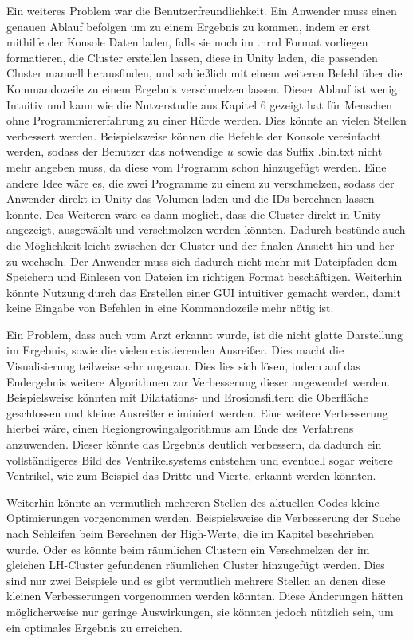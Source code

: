 Ein weiteres Problem war die Benutzerfreundlichkeit. Ein Anwender muss einen genauen Ablauf befolgen um zu einem Ergebnis zu kommen, indem er erst mithilfe der Konsole Daten laden, falls sie noch im .nrrd Format vorliegen formatieren, die Cluster erstellen lassen, diese in Unity laden, die passenden Cluster manuell herausfinden, und schließlich mit einem weiteren Befehl über die Kommandozeile zu einem Ergebnis verschmelzen lassen. Dieser Ablauf ist wenig Intuitiv und kann wie die Nutzerstudie aus Kapitel 6 gezeigt hat für Menschen ohne Programmiererfahrung zu einer Hürde werden.
\newline
Dies könnte an vielen Stellen verbessert werden. Beispielsweise können die Befehle der Konsole vereinfacht werden, sodass der Benutzer das notwendige $u$ sowie das Suffix .bin.txt nicht mehr angeben muss, da diese vom Programm schon hinzugefügt werden. Eine andere Idee wäre es, die zwei Programme zu einem zu verschmelzen, sodass der Anwender direkt in Unity das Volumen laden und die IDs berechnen lassen könnte. Des Weiteren wäre es dann möglich, dass die Cluster direkt in Unity angezeigt, ausgewählt und verschmolzen werden könnten. Dadurch bestünde auch die Möglichkeit leicht zwischen der Cluster und der finalen Ansicht hin und her zu wechseln. Der Anwender muss sich dadurch nicht mehr mit Dateipfaden dem Speichern und Einlesen von Dateien im richtigen Format beschäftigen. Weiterhin könnte Nutzung durch das Erstellen einer GUI intuitiver gemacht werden, damit keine Eingabe von Befehlen in eine Kommandozeile mehr nötig ist.


Ein Problem, dass auch vom Arzt erkannt wurde, ist die nicht glatte Darstellung im Ergebnis, sowie die vielen existierenden Ausreißer. Dies macht die Visualisierung teilweise sehr ungenau.
\newline
Dies lies sich lösen, indem auf das Endergebnis weitere Algorithmen zur Verbesserung dieser angewendet werden. Beispielsweise könnten mit Dilatations- und Erosionsfiltern die Oberfläche geschlossen und kleine Ausreißer eliminiert werden. Eine weitere Verbesserung hierbei wäre, einen Regiongrowingalgorithmus am Ende des Verfahrens anzuwenden. Dieser könnte das Ergebnis deutlich verbessern, da dadurch ein vollständigeres Bild des Ventrikelsystems entstehen und eventuell sogar weitere Ventrikel, wie zum Beispiel das Dritte und Vierte, erkannt werden könnten.


Weiterhin könnte an vermutlich mehreren Stellen des aktuellen Codes kleine Optimierungen vorgenommen werden. Beispielsweise die Verbesserung der Suche nach Schleifen beim Berechnen der High-Werte, die im Kapitel  beschrieben wurde. Oder es könnte beim räumlichen Clustern ein Verschmelzen der im gleichen LH-Cluster gefundenen räumlichen Cluster hinzugefügt werden. Dies sind nur zwei Beispiele und es gibt vermutlich mehrere Stellen an denen diese kleinen Verbesserungen vorgenommen werden könnten.
\newline
Diese Änderungen hätten möglicherweise nur geringe Auswirkungen, sie  könnten jedoch nützlich sein, um ein optimales Ergebnis zu erreichen.


